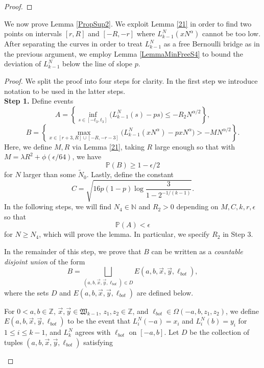 \begin{proof}
	\end{proof}

	We now prove Lemma \ref{PropSup2}. We exploit Lemma \ref{21} in order to find two points on intervals $[r,R]$ and $[-R,-r]$ where $L_{k-1}^N(xN^\alpha)$ cannot be too low. After separating the curves in order to treat $L_{k-1}^N$ as a free Bernoulli bridge as in the previous argument, we employ Lemma \ref{LemmaMinFreeS4} to bound the deviation of $L_{k-1}^N$ below the line of slope $p$.
	
	\begin{proof} We split the proof into four steps for clarity. In the first step we introduce notation to be used in the latter steps.\\
	
	\noindent\textbf{Step 1.} Define events
		\[
		A = \left\{\inf_{s \in [ -t_3, t_3 ]}\big(L^N_{k-1}(s) - p s \big) \leq - R_2N^{\alpha/2}\right\},
		\]
		\[
		B = \left\{ \max_{x\in [r+3, R] \cup [-R,-r-3]} \big(L^N_{k-1}(xN^\alpha) - pxN^\alpha\big) > -MN^{\alpha/2} \right\}.
		\]
		Here, we define $M,R$ via Lemma \ref{21}, taking $R$ large enough so that with $M = \lambda R^2 + \phi(\epsilon/64)$, we have 
		\begin{equation}\label{4.3Bbound}
		\mathbb{P}(B) \geq 1 - \epsilon/2
		\end{equation} 
		for $N$ larger than some $\tilde{N}_0$.
		Lastly, define the constant
		\begin{equation}\label{4.3Cdef}
		C = \sqrt{16p(1-p)\log\frac{3}{1-2^{-1/(k-1)}}}.
		\end{equation}
		In the following steps, we will find $N_4\in\mathbb{N}$ and $R_2 > 0$ depending on $M,C,k,r,\epsilon$ so that 
		\begin{equation}\label{4.3Abound}
		\mathbb{P}(A) < \epsilon
		\end{equation}
		for $N\geq N_4$, which will prove the lemma. In particular, we specify $R_2$ in Step 3.
		
		In the remainder of this step, we prove that $B$ can be written as a \textit{countable disjoint union} of the form
		\begin{equation}\label{4.3disj}
		B = \bigsqcup_{(a,b,\vec{x},\vec{y},\ell_{bot})\in D} E(a,b,\vec{x},\vec{y},\ell_{bot}),
		\end{equation}
		where the sets $D$ and $E(a,b,\vec{x},\vec{y},\ell_{bot})$ are defined below.
		
		For $0<a,b\in\mathbb{Z}$, $\vec{x},\vec{y}\in\mathfrak{W}_{k-1}$, $z_1,z_2\in\mathbb{Z}$, and $\ell_{bot}\in\Omega(-a,b,z_1,z_2)$, we define $E(a,b,\vec{x},\vec{y},\ell_{bot})$ to be the event that $L_i^N(-a) = x_i$ and $L_i^N(b) = y_i$ for $1\leq i\leq k-1$, and $L_k^N$ agrees with $\ell_{bot}$ on $[-a,b]$. Let $D$ be the collection of tuples $(a,b,\vec{x},\vec{y},\ell_{bot})$ satisfying 
		\begin{enumerate}[label=(\arabic*)]
			

\end{enumerate}
\end{proof}
